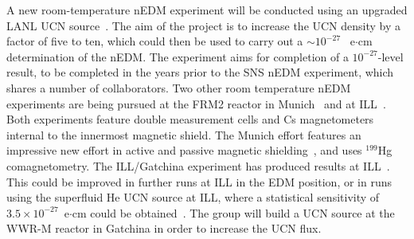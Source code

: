 A new room-temperature nEDM experiment will be conducted using an
upgraded LANL UCN source~\cite{Steven_talk}. The aim of the project is
to increase the UCN density by a factor of five to ten, which could
then be used to carry out a $\sim 10^{-27}$~ e$\cdot$cm determination
of the nEDM.  The experiment aims for completion of a $10^{-27}$-level
result, to be completed in the years prior to the SNS nEDM experiment,
which shares a number of collaborators.  Two other room temperature
nEDM experiments are being pursued at the FRM2 reactor in
Munich~\cite{altarev2012} and at ILL~\cite{Serebrov2015}. Both
experiments feature double measurement cells and Cs magnetometers
internal to the innermost magnetic shield. The Munich effort features
an impressive new effort in active and passive magnetic
shielding~\cite{altarev2014magnetically,
  altarev2015large,altarev2015minimizing,altarev2012next}, and uses
$^{199}$Hg comagnetometry. The ILL/Gatchina experiment has produced
results at ILL~\cite{Serebrov2015}. This could be improved in further
runs at ILL in the EDM position, or in runs using the superfluid He
UCN source at ILL, where a statistical sensitivity of
$3.5 \times 10^{-27}$~e$\cdot$cm could be
obtained~\cite{Serebrov_talk}. The group will build a UCN source at
the WWR-M reactor in Gatchina in order to increase the UCN flux.









